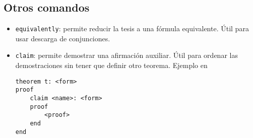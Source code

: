 \subsection{Otros comandos}

\begin{itemize}
    \item \lstinline{equivalently}: permite reducir la tesis a una fórmula
    equivalente. Útil para usar descarga de conjunciones.
    
    

    \item \lstinline{claim}: permite demostrar una afirmación auxiliar. Útil
    para ordenar las demostraciones sin tener que definir otro teorema. Ejemplo
    en 

    \begin{lstlisting}[numbers=none]
theorem t: <form>
proof
    claim <name>: <form>
    proof
        <proof>
    end
end
    \end{lstlisting}
\end{itemize}
